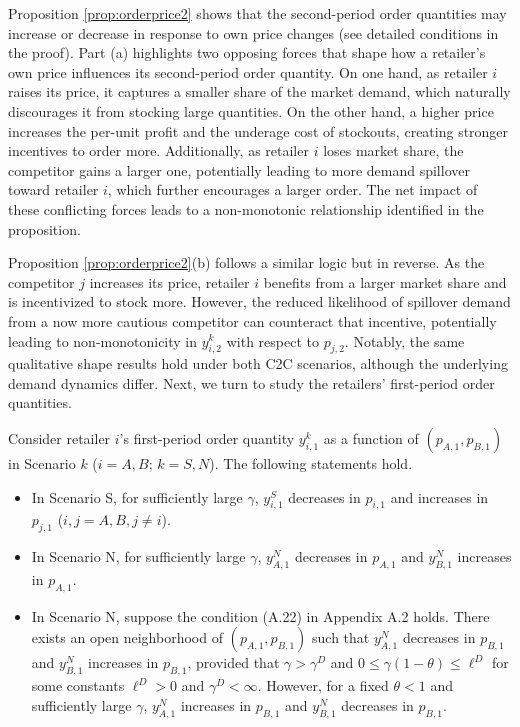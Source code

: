 \documentclass[nonblindrev,copyedit]{informs1}
\begin{document}
Proposition \ref{prop:orderprice2} shows that the second-period order quantities may increase or decrease in response to own price changes (see detailed conditions in the proof). Part (a) highlights two opposing forces that shape how a retailer’s own price influences its second-period order quantity. On one hand, as retailer $i$ raises its price, it captures a smaller share of the market demand, which naturally discourages it from stocking large quantities. On the other hand, a higher price increases the per-unit profit and the underage cost of stockouts, creating stronger incentives to order more. Additionally, as retailer $i$ loses market share, the competitor gains a larger one, potentially leading to more demand spillover toward retailer $i$, which further encourages a larger order. The net impact of these conflicting forces leads to a non-monotonic relationship identified in the proposition.

Proposition \ref{prop:orderprice2}(b) follows a similar logic but in reverse. As the competitor $j$ increases its price, retailer $i$ benefits from a larger market share and is incentivized to stock more. However, the reduced likelihood of spillover demand from a now more cautious competitor can counteract that incentive, potentially leading to non-monotonicity in $y^k_{i,2}$ with respect to $p_{j,2}$. Notably, the same qualitative shape results hold under both C2C scenarios, although the underlying demand dynamics differ.
Next, we turn to study the retailers' first-period order quantities.

\begin{proposition} \label{prop:orderprice1}
    Consider retailer $i$'s first-period order quantity $y_{i,1}^k$ as a function of $(p_{A,1}, p_{B,1})$ in Scenario $k$ ($i=A,B$; $k=S,N$). The following statements hold.
    \begin{itemize}
        \item [(a)] In Scenario S, for sufficiently large $\gamma$, $y^S_{i,1}$ decreases in $p_{i,1}$ and increases in $p_{j,1}$ ($i,j=A,B, j \neq i$).
        \item [(b1)] In Scenario N, for sufficiently large $\gamma$, $y^N_{A,1}$ decreases in $p_{A,1}$ and $y^N_{B,1}$ increases in $p_{A,1}$.
        \item [(b2)]
        In Scenario N, suppose the condition (A.22) in Appendix A.2 holds. There exists an open neighborhood of $(p_{A,1}, p_{B,1})$ such that $y^N_{A,1}$ decreases in $p_{B,1}$ and $y^N_{B,1}$ increases in $p_{B,1}$, provided that $\gamma>\gamma^D$ and $0\leq\gamma(1-\theta)\leq\ell^D$ for some constants $\ell^D>0$ and $\gamma^D<\infty$. However, for a fixed $\theta<1$ and sufficiently large $\gamma$, $y^N_{A,1}$ increases in $p_{B,1}$ and $y^N_{B,1}$ decreases in $p_{B,1}$.
    \end{itemize}
\end{proposition}
\end{document}

